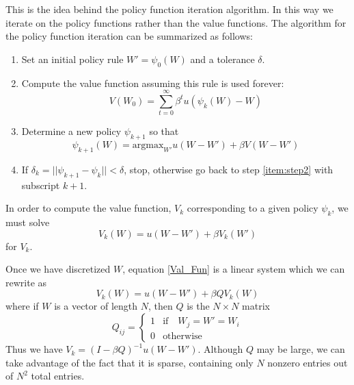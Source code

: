 This is the idea behind the policy function iteration algorithm.  In this way we iterate on the policy functions rather than the value functions.  The algorithm for the policy function iteration can be summarized as follows:
\begin{enumerate}
\item Set an initial policy rule $W' = \psi_0(W)$ and a tolerance $\delta$.

\item \label{item:step2} Compute the value function assuming this rule is used forever:
\begin{equation*}
V(W_0) = \sum_{t=0}^\infty \beta^t u(\psi_k(W)-W)
\end{equation*}

\item Determine a new policy $\psi_{k+1}$ so that
\begin{equation*}
\psi_{k+1}(W) = \text{argmax}_{W'} u(W-W') + \beta V(W-W')
\end{equation*}

\item If $\delta_k = ||\psi_{k+1} - \psi_k|| < \delta$, stop, otherwise go back to step \ref{item:step2} with subscript $k+1$.
\end{enumerate}
In order to compute the value function, $V_k$ corresponding to a given policy $\psi_k$, we must solve
\begin{equation}
\label{Val_Fun}
V_k(W) = u(W-W') + \beta V_k(W')
\end{equation}
for $V_k$.

Once we have discretized $W$, equation \eqref{Val_Fun} is a linear system which we can rewrite as
\begin{equation*}
V_k(W) = u(W-W') + \beta QV_k(W)
\end{equation*}
where if $W$ is a vector of length $N$, then $Q$ is the $N\times N$ matrix
\begin{equation*}
Q_{ij} = \left\{
     \begin{array}{ll}
       1 & \text{if} \quad  W_j = W' = W_i\\
       0 & \text{otherwise}
     \end{array}
   \right.
\end{equation*}
Thus we have $V_k = (I-\beta Q)^{-1}u(W-W')$.  Although $Q$ may be large, we can take advantage of the fact that it is sparse, containing only $N$ nonzero entries out of $N^2$ total entries.

